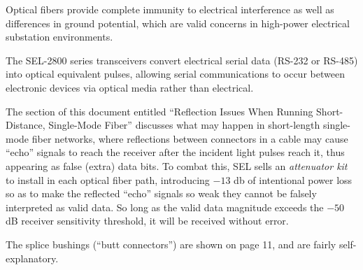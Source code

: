 













Optical fibers provide complete immunity to electrical interference as well as differences in ground potential, which are valid concerns in high-power electrical substation environments.

\vskip 10pt

The SEL-2800 series transceivers convert electrical serial data (RS-232 or RS-485) into optical equivalent pulses, allowing serial communications to occur between electronic devices via optical media rather than electrical.

\vskip 10pt

The section of this document entitled ``Reflection Issues When Running Short-Distance, Single-Mode Fiber'' discusses what may happen in short-length single-mode fiber networks, where reflections between connectors in a cable may cause ``echo'' signals to reach the receiver after the incident light pulses reach it, thus appearing as false (extra) data bits.  To combat this, SEL sells an {\it attenuator kit} to install in each optical fiber path, introducing $-13$ db of intentional power loss so as to make the reflected ``echo'' signals so weak they cannot be falsely interpreted as valid data.  So long as the valid data magnitude exceeds the $-50$ dB receiver sensitivity threshold, it will be received without error.

\vskip 10pt

The splice bushings (``butt connectors'') are shown on page 11, and are fairly self-explanatory.





